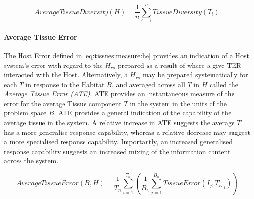 
\begin{equation}
	AverageTissueDiversity(H) = \frac{1}{n}\sum_{i=1}^n TissueDiversity(T_i)
	\label{eq:tissues:measure:atd}
\end{equation}


%
%
\paragraph{Average Tissue Error}
The Host Error defined in \ref{eq:tissues:measure:he} provides an indication of a Host system's error with regard to the $H_{rs}$ prepared as a result of where a give TER interacted with the Host. Alternatively, a $H_{rs}$ may be prepared systematically for each $T$ in response to the Habitat $B$, and averaged across all $T$ in $H$ called the \emph{Average Tissue Error (ATE)}. ATE provides an instantaneous measure of the error for the average Tissue component $T$ in the system in the units of the problem space $B$.
ATE provides a general indication of the capability of the average tissue in the system. A relative increase in ATE suggests the average $T$ has a more generalise response capability, whereas a relative decrease may suggest a more specialised response capability. Importantly, an increased generalised response capability suggests an increased mixing of the information content across the system.

\begin{equation}
	AverageTissueError(B, H) =  
	\frac{1}{T_n} \sum_{i=1}^{T_n}
	\left(\frac{1}{B_n} \sum_{j=1}^{B_n} TissueError(I_j, {T_{rs}}_i)\right)
	\label{eq:tissues:measure:ate}
\end{equation}

%
%
